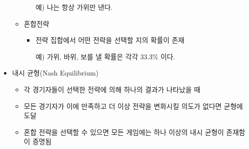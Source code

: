 \begin{itemize}
\begin{itemize}
\begin{itemize}
		\item[예)] 나는 항상 가위만 낸다.
		\end{itemize}
	\item 혼합전략
		\begin{itemize}
		\item 전략 집합에서 어떤 전략을 선택할 지의 확률이 존재
		\item[예)] 가위, 바위, 보를 낼 확률은 각각 33.3\% 이다.
		\end{itemize}
	\end{itemize}
\item 내시 균형(Nash Equilibrium)
	\begin{itemize}
	\item 각 경기자들이 선택한 전략에 의해 하나의 결과가 나타났을 때 
	\item 모든 경기자가 이에 만족하고 더 이상 전략을 변화시킬 의도가 없다면 균형에 도달
	\item 혼합 전략을 선택할 수 있으면 모든 게임에는 하나 이상의 내시 균형이 존재함이 증명됨
	\end{itemize}
\end{itemize}

